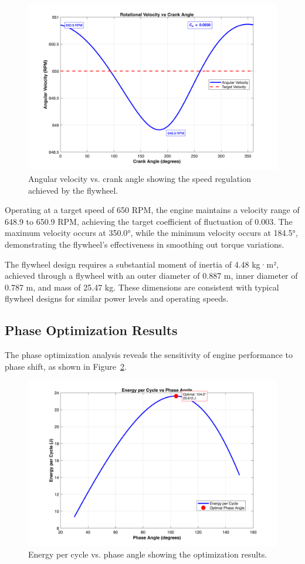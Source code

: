 \documentclass[12pt]{article}
\begin{document}
\begin{figure}[htbp]
  \centering
  \includegraphics[width=0.8\linewidth]{../angular_velocity.png}
  \caption{Angular velocity vs. crank angle showing the speed regulation achieved by the flywheel.}
  \label{fig:angular_velocity}
\vspace{-6pt}\end{figure}

Operating at a target speed of 650 RPM, the engine maintains a velocity range of 648.9 to 650.9 RPM, achieving the target coefficient of fluctuation of 0.003. The maximum velocity occurs at 350.0°, while the minimum velocity occurs at 184.5°, demonstrating the flywheel's effectiveness in smoothing out torque variations.

The flywheel design requires a substantial moment of inertia of 4.48 kg·m², achieved through a flywheel with an outer diameter of 0.887 m, inner diameter of 0.787 m, and mass of 25.47 kg. These dimensions are consistent with typical flywheel designs for similar power levels and operating speeds.

\subsection{Phase Optimization Results}
The phase optimization analysis reveals the sensitivity of engine performance to phase shift, as shown in Figure~\ref{fig:energy_phase}.

\begin{figure}[H]
  \centering
  \includegraphics[width=0.8\linewidth]{../energy_vs_phase.png}
  \caption{Energy per cycle vs. phase angle showing the optimization results.}
  \label{fig:energy_phase}
\vspace{-6pt}\end{figure}
\end{document}
